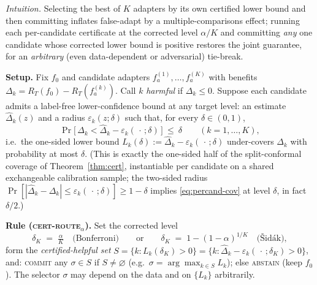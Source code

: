 %

\begin{theorem}
\label{thm:multicand}\label{thm:routing}
\emph{Intuition.} Selecting the best of $K$ adapters by its own certified lower bound and
then committing inflates false-adapt by a multiple-comparisons effect; running each
per-candidate certificate at the corrected level $\alpha/K$ and committing \emph{any} one
candidate whose corrected lower bound is positive restores the joint guarantee, for an
\emph{arbitrary} (even data-dependent or adversarial) tie-break.

\textbf{Setup.} Fix $f_0$ and candidate adapters $f_a^{(1)},\dots,f_a^{(K)}$ with benefits
$\Delta_k=R_T(f_0)-R_T(f_a^{(k)})$. Call $k$ \emph{harmful} if $\Delta_k\le0$. Suppose each
candidate admits a label-free lower-confidence bound at any target level: an estimate
$\hat\Delta_k(z)$ and a radius $\varepsilon_k(z;\delta)$ such that, for every $\delta\in(0,1)$,
\begin{equation}\label{eq:percand-cov}
\Pr\!\big[\,\Delta_k<\hat\Delta_k-\varepsilon_k(\,\cdot\,;\delta)\,\big]\ \le\ \delta
\qquad(k=1,\dots,K),
\end{equation}
i.e.\ the one-sided lower bound $L_k(\delta):=\hat\Delta_k-\varepsilon_k(\,\cdot\,;\delta)$
under-covers $\Delta_k$ with probability at most $\delta$. (This is exactly the one-sided
half of the split-conformal coverage of Theorem~\ref{thm:cert}, instantiable per candidate
on a shared exchangeable calibration sample; the two-sided radius
$\Pr[|\hat\Delta_k-\Delta_k|\le\varepsilon_k(\,\cdot\,;\delta)]\ge1-\delta$ implies
\eqref{eq:percand-cov} at level $\delta$, in fact $\delta/2$.)

\textbf{Rule (\textsc{cert-route}$_\alpha$).} Set the corrected level
\[
\delta_K \;=\; \tfrac{\alpha}{K}\quad\text{(Bonferroni)}\qquad\text{or}\qquad
\delta_K \;=\; 1-(1-\alpha)^{1/K}\quad\text{(\v Sid\'ak)},
\]
form the \emph{certified-helpful set}
$S=\{k: L_k(\delta_K)>0\}=\{k:\hat\Delta_k-\varepsilon_k(\,\cdot\,;\delta_K)>0\}$, and:
\textsc{commit} any $\sigma\in S$ if $S\neq\varnothing$ (e.g.\ $\sigma=\arg\max_{k\in S}L_k$);
else \textsc{abstain} (keep $f_0$). The selector $\sigma$ may depend on the data and on
$\{L_k\}$ arbitrarily.


\end{theorem}
